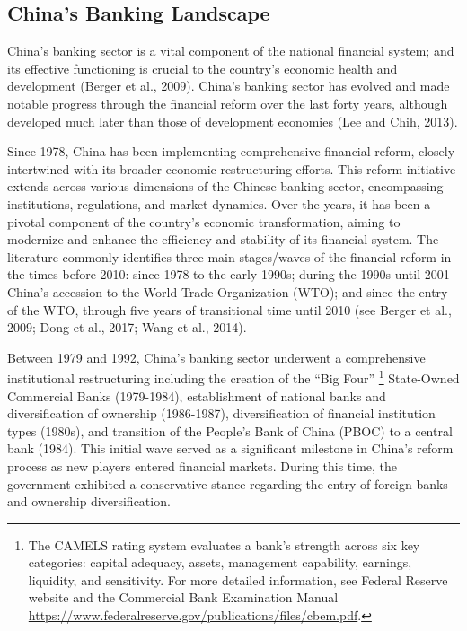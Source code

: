 \documentclass[
  12pt,
  a4paper,
  DIV=11,
  numbers=noendperiod]{scrreprt}
\begin{document}
\subsection{China's Banking Landscape}\label{chinas-banking-landscape}

China's banking sector is a vital component of the national financial
system; and its effective functioning is crucial to the country's
economic health and development (Berger et al., 2009). China's banking
sector has evolved and made notable progress through the financial
reform over the last forty years, although developed much later than
those of development economies (Lee and Chih, 2013).

Since 1978, China has been implementing comprehensive financial reform,
closely intertwined with its broader economic restructuring efforts.
This reform initiative extends across various dimensions of the Chinese
banking sector, encompassing institutions, regulations, and market
dynamics. Over the years, it has been a pivotal component of the
country's economic transformation, aiming to modernize and enhance the
efficiency and stability of its financial system. The literature
commonly identifies three main stages/waves of the financial reform in
the times before 2010: since 1978 to the early 1990s; during the 1990s
until 2001 China's accession to the World Trade Organization (WTO); and
since the entry of the WTO, through five years of transitional time
until 2010 (see Berger et al., 2009; Dong et al., 2017; Wang et al.,
2014).

Between 1979 and 1992, China's banking sector underwent a comprehensive
institutional restructuring including the creation of the ``Big Four''
\footnote{The CAMELS rating system evaluates a bank's strength across
  six key categories: capital adequacy, assets, management capability,
  earnings, liquidity, and sensitivity. For more detailed information,
  see Federal Reserve website and the Commercial Bank Examination Manual
  \url{https://www.federalreserve.gov/publications/files/cbem.pdf}.}
State-Owned Commercial Banks (1979-1984), establishment of national
banks and diversification of ownership (1986-1987), diversification of
financial institution types (1980s), and transition of the People's Bank
of China (PBOC) to a central bank (1984). This initial wave served as a
significant milestone in China's reform process as new players entered
financial markets. During this time, the government exhibited a
conservative stance regarding the entry of foreign banks and ownership
diversification.
\end{document}

